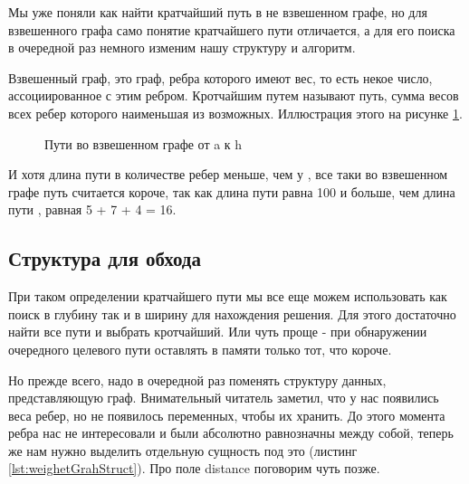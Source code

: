 \documentclass[../article.tex]{subfiles}
\begin{document}
{Мы уже поняли как найти кратчайший путь в не взвешенном графе, но для взвешенного графа само понятие кратчайшего пути отличается, а для его поиска в очередной раз немного изменим нашу структуру и алгоритм.}

Взвешенный граф, это граф, ребра которого имеют вес, то есть некое число, ассоциированное с этим ребром. Кротчайшим путем называют путь, сумма весов всех ребер которого наименьшая из возможных. Иллюстрация этого на рисунке \ref{fig:compareWeightedPaths}.

\begin{figure}
    \caption{Пути во взвешенном графе от {\firacodebold a} к {\firacodebold h}}
    \label{fig:compareWeightedPaths}
\end{figure}

И хотя длина пути {\firacodebold [a, h]} в количестве ребер меньше, чем у {\firacodebold [a, f, g, h]}, все таки во взвешенном графе путь {\firacodebold [a, f, g, h]} считается короче, так как длина пути {\firacodebold [a, h]} равна 100 и больше, чем длина пути {\firacodebold [a, f, g, h]}, равная 5 + 7 + 4 = 16.

\subsection{Структура для обхода}

При таком определении кратчайшего пути мы все еще можем использовать как поиск в глубину так и в ширину для нахождения решения. Для этого достаточно найти все пути и выбрать кротчайший. Или чуть проще - при обнаружении очередного целевого пути оставлять в памяти только тот, что короче.

Но прежде всего, надо в очередной раз поменять структуру данных, представляющую граф. Внимательный читатель заметил, что у нас появились веса ребер, но не появилось переменных, чтобы их хранить. До этого момента ребра нас не интересовали и были абсолютно равнозначны между собой, теперь же нам нужно выделить отдельную сущность под это (листинг \ref{lst:weighetGrahStruct}). Про поле {\firacodebold distance} поговорим чуть позже.
\end{document}
